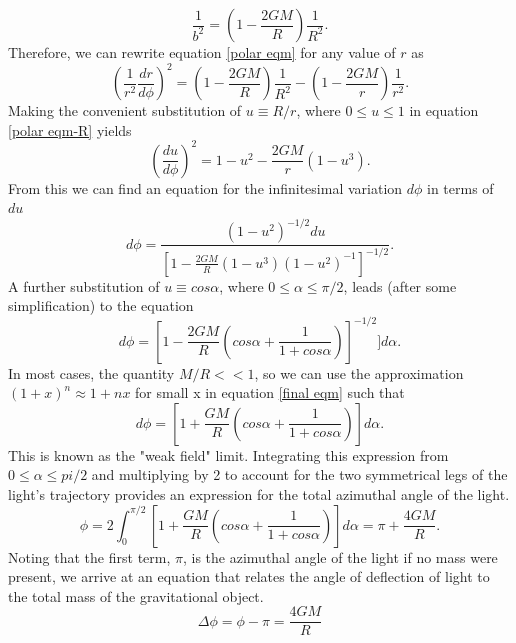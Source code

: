 \documentclass[a4paper,12pt]{article}
\begin{document}
\begin{equation} 
\frac{1}{b^2} = (1-\frac{2GM}{R})\frac{1}{R^2}.
\end{equation} 
Therefore, we can rewrite equation \ref{polar eqm} for any value of $r$ as
\begin{equation} \label{polar eqm-R}
(\frac{1}{r^2} \frac{dr}{d \phi})^2 = (1-\frac{2GM}{R})\frac{1}{R^2} - (1-\frac{2GM}{r})\frac{1}{r^2}.
\end{equation}
Making the convenient substitution of $u \equiv R/r$, where $0 \leq u \leq 1$ in equation \ref{polar eqm-R} yields 
\begin{equation} \label{polar eqm-u}
(\frac{du}{d\phi})^2 = 1- u^2 - \frac{2GM}{r}(1-u^3).
\end{equation}
From this we can find an equation for the infinitesimal variation $d\phi$ in terms of $du$
\begin{equation} \label{dphi eqm}
d\phi = \frac{(1-u^2)^{-1/2}du}{[1 - \frac{2GM}{R}(1-u^3)(1-u^2)^{-1}]^{-1/2}}.
\end{equation}
A further substitution of $u \equiv cos\alpha$, where $0 \leq \alpha \leq \pi/2$, leads (after some simplification) to the equation
\begin{equation} \label{final eqm}
d\phi = [1-\frac{2GM}{R}(cos\alpha + \frac{1}{1+cos\alpha})]^{-1/2}] d\alpha.
\end{equation}
In most cases, the quantity $M/R<<1$, so we can use the approximation $(1+x)^n \approx 1+nx$ for small x in equation \ref{final eqm} such that
\begin{equation}
d\phi = [1 + \frac{GM}{R}(cos\alpha + \frac{1}{1+cos\alpha})]d\alpha.
\end{equation}
This is known as the "weak field" limit.  Integrating this expression from $0 \leq \alpha \leq pi/2$ and multiplying by 2 to account for the two symmetrical legs of the light's trajectory provides an expression for the total azimuthal angle of the light.
\begin{equation} \label{polar angle}
\phi = 2 \int_{0}^{\pi/2} [1 + \frac{GM}{R}(cos\alpha + \frac{1}{1+cos\alpha})] d\alpha = \pi + \frac{4GM}{R}.
\end{equation}
Noting that the first term, $\pi$, is the azimuthal angle of the light if no mass were present, we arrive at an equation that relates the angle of deflection of light to the total mass of the gravitational object. 
\begin{equation} \label{final GR}
\Delta \phi = \phi - \pi = \frac{4GM}{R} 
\end{equation}
\end{document}
